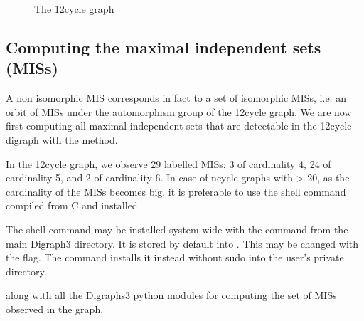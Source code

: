 \documentclass[a4paper,12pt,english]{sphinxhowto}
\let\sphinxpxdimen\pdfpxdimen\else\newdimen\sphinxpxdimen
\begin{document}
\begin{figure}[H]
\centering
\capstart

\noindent\sphinxincludegraphics[width=400\sphinxpxdimen]{{cg12}.png}
\caption{The 12\sphinxhyphen{}cycle graph}\label{\detokenize{tutorial:id130}}\end{figure}


\subsection{Computing the maximal independent sets (MISs)}
\label{\detokenize{tutorial:computing-the-maximal-independent-sets-miss}}
A non isomorphic MIS corresponds in fact to a set of isomorphic MISs, i.e. an orbit of MISs under the automorphism group of the 12\sphinxhyphen{}cycle graph. We are now first computing all maximal independent sets that are detectable in the 12\sphinxhyphen{}cycle digraph with the  method.

\begin{sphinxVerbatim}[commandchars=\\\{\},numbers=left,firstnumber=1,stepnumber=1]
\end{sphinxVerbatim}

In the 12\sphinxhyphen{}cycle graph, we observe 29 labelled MISs: \textendash{} 3 of cardinality 4, 24 of cardinality 5, and 2  of cardinality 6. In case of n\sphinxhyphen{}cycle graphs with  \textgreater{} 20, as the cardinality of the MISs becomes big, it is preferable to use the shell  command compiled from C and installed %
\begin{footnote}[3]\sphinxAtStartFootnote
The  shell command may be installed system wide with the command  from the main Digraph3 directory. It is stored by default into . This may be changed with the  flag. The command  installs it instead without sudo into the user’s private  directory.
%
\end{footnote}  along with all the Digraphs3 python modules for computing the set of MISs observed in the graph.
\end{document}
